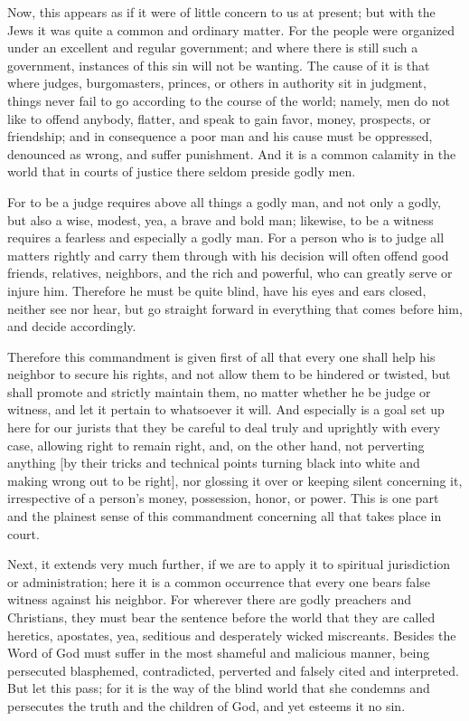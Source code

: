 Now, this appears as if it were of little concern to us at present; but
with the Jews it was quite a common and ordinary matter. For the people
were organized under an excellent and regular government; and where
there is still such a government, instances of this sin will not be
wanting. The cause of it is that where judges, burgomasters, princes,
or others in authority sit in judgment, things never fail to go
according to the course of the world; namely, men do not like to offend
anybody, flatter, and speak to gain favor, money, prospects, or
friendship; and in consequence a poor man and his cause must be
oppressed, denounced as wrong, and suffer punishment. And it is a
common calamity in the world that in courts of justice there seldom
preside godly men.

For to be a judge requires above all things a godly man, and not only a
godly, but also a wise, modest, yea, a brave and bold man; likewise, to
be a witness requires a fearless and especially a godly man. For a
person who is to judge all matters rightly and carry them through with
his decision will often offend good friends, relatives, neighbors, and
the rich and powerful, who can greatly serve or injure him. Therefore
he must be quite blind, have his eyes and ears closed, neither see nor
hear, but go straight forward in everything that comes before him, and
decide accordingly.

Therefore this commandment is given first of all that every one shall
help his neighbor to secure his rights, and not allow them to be
hindered or twisted, but shall promote and strictly maintain them, no
matter whether he be judge or witness, and let it pertain to whatsoever
it will. And especially is a goal set up here for our jurists that they
be careful to deal truly and uprightly with every case, allowing right
to remain right, and, on the other hand, not perverting anything [by
their tricks and technical points turning black into white and making
wrong out to be right], nor glossing it over or keeping silent
concerning it, irrespective of a person's money, possession, honor, or
power. This is one part and the plainest sense of this commandment
concerning all that takes place in court.

Next, it extends very much further, if we are to apply it to spiritual
jurisdiction or administration; here it is a common occurrence that
every one bears false witness against his neighbor. For wherever there
are godly preachers and Christians, they must bear the sentence before
the world that they are called heretics, apostates, yea, seditious and
desperately wicked miscreants. Besides the Word of God must suffer in
the most shameful and malicious manner, being persecuted blasphemed,
contradicted, perverted and falsely cited and interpreted. But let this
pass; for it is the way of the blind world that she condemns and
persecutes the truth and the children of God, and yet esteems it no
sin.

